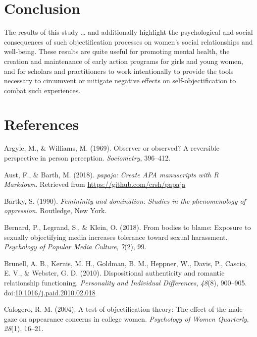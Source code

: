 \documentclass[man]{apa6}
\begin{document}
\section{Conclusion}\label{conclusion}

The results of this study \ldots{} and additionally highlight the
psychological and social consequences of such objectification processes
on women's social relationships and well-being. These results are quite
useful for promoting mental health, the creation and maintenance of
early action programs for girls and young women, and for scholars and
practitioners to work intentionally to provide the tools necessary to
circumvent or mitigate negative effects on self-objectification to
combat such experiences.

\newpage

\section{References}\label{references}

\begingroup
\setlength{\parindent}{-0.5in} \setlength{\leftskip}{0.5in}

\hypertarget{refs}{}
\hypertarget{ref-argyle1969}{}
Argyle, M., \& Williams, M. (1969). Observer or observed? A reversible
perspective in person perception. \emph{Sociometry}, 396--412.

\hypertarget{ref-R-papaja}{}
Aust, F., \& Barth, M. (2018). \emph{papaja: Create APA manuscripts with
R Markdown}. Retrieved from \url{https://github.com/crsh/papaja}

\hypertarget{ref-Bartky}{}
Bartky, S. (1990). \emph{Femininity and domination: Studies in the
phenomenology of oppression}. Routledge, New York.

\hypertarget{ref-bernard2018bodies}{}
Bernard, P., Legrand, S., \& Klein, O. (2018). From bodies to blame:
Exposure to sexually objectifying media increases tolerance toward
sexual harassment. \emph{Psychology of Popular Media Culture},
\emph{7}(2), 99.

\hypertarget{ref-brunelletal2010}{}
Brunell, A. B., Kernis, M. H., Goldman, B. M., Heppner, W., Davis, P.,
Cascio, E. V., \& Webster, G. D. (2010). Dispositional authenticity and
romantic relationship functioning. \emph{Personality and Individual
Differences}, \emph{48}(8), 900--905.
doi:\href{https://doi.org/10.1016/j.paid.2010.02.018}{10.1016/j.paid.2010.02.018}

\hypertarget{ref-calogero2004test}{}
Calogero, R. M. (2004). A test of objectification theory: The effect of
the male gaze on appearance concerns in college women. \emph{Psychology
of Women Quarterly}, \emph{28}(1), 16--21.
\end{document}
